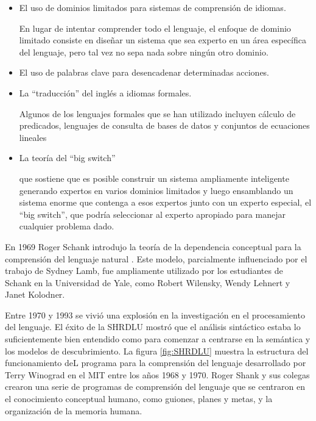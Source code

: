 \documentclass[12pt]{article}
\begin{document}
			\begin{itemize}
				\item El uso de dominios limitados para sistemas de comprensión de idiomas. 
				
				En lugar de intentar comprender todo el lenguaje, el enfoque de dominio limitado consiste en diseñar un sistema que sea experto en un área específica del lenguaje, pero tal vez no sepa nada sobre ningún otro dominio.
							
				\item  El uso de palabras clave para desencadenar determinadas acciones.
				
				\item La ``traducción'' del inglés a idiomas formales. 
				
				Algunos de los lenguajes formales que se han utilizado incluyen cálculo de predicados, lenguajes de consulta de bases de datos y conjuntos de ecuaciones lineales
				
				\item La teoría del ``big switch''
				
				que sostiene que es posible construir un sistema ampliamente inteligente generando expertos en varios dominios limitados y luego ensamblando un sistema enorme que contenga a esos expertos junto con un experto especial, el ``big switch'', que podría seleccionar al experto apropiado para manejar cualquier problema dado.\cite{Lehnert2014}
				
			\end{itemize}
			
			
			En 1969 Roger Schank introdujo la teoría de la dependencia conceptual para la comprensión del lenguaje natural . Este modelo, parcialmente influenciado por el trabajo de Sydney Lamb, fue ampliamente utilizado por los estudiantes de Schank en la Universidad de Yale, como Robert Wilensky, Wendy Lehnert y Janet Kolodner.\cite{Schank1969}
			
			Entre 1970 y 1993 se vivió una explosión en la investigación en el procesamiento del lenguaje. El éxito de la SHRDLU mostró que el análisis sintáctico estaba lo suficientemente bien entendido como para comenzar a centrarse en la semántica y los modelos de descubrimiento. La figura \ref{fig:SHRDLU} muestra la estructura del funcionamiento deL programa para la comprensión del lenguaje desarrollado por Terry Winograd en el MIT entre los años 1968 y 1970. Roger Shank y sus colegas crearon una serie de programas de comprensión del lenguaje que se centraron en el conocimiento conceptual humano, como guiones, planes y metas, y la organización de la memoria humana.\cite{Kumar2011}
			
\end{document}
